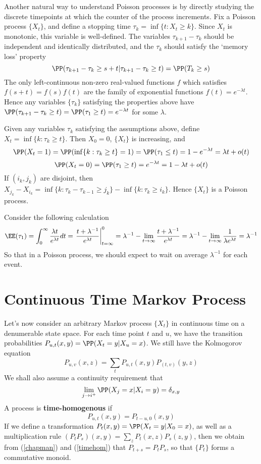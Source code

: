 Another natural way to understand Poisson processes is by directly studying the discrete timepoints at which the counter of the process increments. Fix a Poisson process $\{ X_t \}$, and define a stopping time $\tau_k = \inf \{ t: X_t \geq k \}$. Since $X_t$ is monotonic, this variable is well-defined. The variables $\tau_{k+1} - \tau_k$ should be independent and identically distributed, and the $\tau_k$ should satisfy the `memory loss' property
%
\[ \PP(\tau_{k+1} - \tau_k \geq s + t | \tau_{k+1} - \tau_k \geq t) = \PP(T_k \geq s) \]
%
The only left-continuous non-zero real-valued functions $f$ which satisfies $f(s + t) = f(s) f(t)$ are the family of exponential functions $f(t) = e^{-\lambda t}$. Hence any variables $\{ \tau_k \}$ satisfying the properties above have $\PP(\tau_{k+1} - \tau_k \geq t) = \PP(\tau_1 \geq t) = e^{-\lambda t}$ for some $\lambda$.

Given any variables $\tau_k$ satisfying the assumptions above, define $X_t = \inf \{ k: \tau_k \geq t \}$. Then $X_0 = 0$, $\{ X_t \}$ is increasing, and
%
\[ \PP(X_t = 1) = \PP(\inf \{ k : \tau_k \geq t \} = 1) = \PP(\tau_1 \leq t) = 1 - e^{-\lambda t} = \lambda t + o(t) \]
%
\[ \PP(X_t = 0) = \PP(\tau_1 \geq t) = e^{-\lambda t} = 1 - \lambda t + o(t) \]
%
If $(i_k, j_k)$ are disjoint, then $X_{j_k} - X_{i_k} = \inf \{ k : \tau_k - \tau_{k-1} \geq j_k \} - \inf \{ k : \tau_k \geq i_k \}$. Hence $\{ X_t \}$ is a Poisson process.

Consider the following calculation
%
\[ \EE(\tau_1) = \int_0^\infty \frac{\lambda t}{e^{\lambda t}} dt = \left.\frac{t + \lambda^{-1}}{e^{\lambda t}} \right|_{t = \infty}^0 = \lambda^{-1} - \lim_{t \to \infty} \frac{t + \lambda^{-1}}{e^{\lambda t}} = \lambda^{-1} - \lim_{t \to \infty} \frac{1}{\lambda e^{\lambda t}} = \lambda^{-1} \]
%
So that in a Poisson process, we should expect to wait on average $\lambda^{-1}$ for each event.

\section{Continuous Time Markov Process}

Let's now consider an arbitrary Markov process $\{ X_t \}$ in continuous time on a denumerable state space. For each time point $t$ and $u$, we have the transition probabilities $P_{u,t}(x,y) = \PP(X_t = y | X_u = x)$. We still have the Kolmogorov equation
%
\begin{equation} \label{chapman} P_{u,v}(x,z) = \sum_t P_{u,t}(x,y) P_(t,v)(y,z) \end{equation}
%
We shall also assume a continuity requirement that
%
\begin{equation} \label{continuity} \lim_{j \to i^+} \PP(X_j = x | X_i = y) = \delta_{x,y} \end{equation}
%
A process is {\bf time-homogenous} if
%
\begin{equation} \label{timehom} P_{u,t}(x,y) = P_{t-u,0}(x,y) \end{equation}
%
If we define a transformation $P_t(x,y) = \PP(X_t = y | X_0 = x)$, as well as a multiplication rule $(P_t P_s)(x,y) = \sum_z P_t(x,z) P_s(z,y)$, then we obtain from (\ref{chapman}) and (\ref{timehom}) that $P_{t+s} = P_t P_s$, so that $\{ P_t \}$ forms a commutative monoid.

